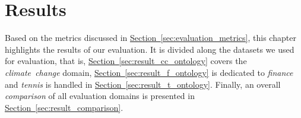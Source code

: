 \chapter{Results}\label{chap:results}
Based on the metrics discussed in \hyperref[sec:evaluation_metrics]{Section~\ref*{sec:evaluation_metrics}}, this chapter highlights the results of our evaluation.
It is divided along the datasets we used for evaluation, that is, \hyperref[sec:result_cc_ontology]{Section~\ref*{sec:result_cc_ontology}} covers the \emph{climate~change} domain, \hyperref[sec:result_f_ontology]{Section~\ref*{sec:result_f_ontology}} is dedicated to \emph{finance} and \emph{tennis} is handled in \hyperref[sec:result_t_ontology]{Section~\ref*{sec:result_t_ontology}}. Finally, an overall \emph{comparison} of all evaluation domains is presented in \hyperref[sec:result_comparison]{Section~\ref*{sec:result_comparison}}.











